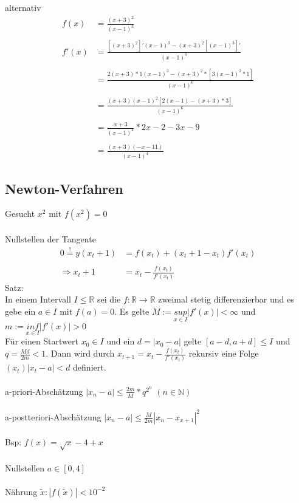 \documentclass{article}
\begin{document}

alternativ
\begin{align*}
f(x) &= \frac {(x+3)^2}{(x-1)^3}\\\\
f'(x) &= \frac{[(x+3)^2]'(x-1)^3-(x+3)^2[(x-1)^3]'}{(x-1)^6}\\\\
&= \frac{2(x+3)*1(x-1)^3 - (x+3)^2 *[3(x-1)^2 *1]}{(x-1)^6}\\\\
&= \frac{(x+3)(x-1)^2[2(x-1)-(x+3)*3]}{(x-1)^6}\\\\
&= \frac{x+3}{(x-1)^4} * 2x-2-3x-9\\\\
&= \frac{(x+3)(-x-11)}{(x-1)^4}
\end{align*}

\subsection{Newton-Verfahren}

Gesucht \(x^2\) mit \(f(x^2)=0\)\\\\
Nullstellen der Tangente
\begin{align*}
0\overset{!}{=}y(x_t+1) &= f(x_t)+(x_t+1-x_t)f'(x_t)\\\\
\Longrightarrow x_t+1 &= x_t - \frac{f(x_t)}{f'(x_t)}
\end{align*}
Satz:\\
In einem Intervall \(I \le \mathbb{R}\) sei die \(f:\mathbb{R} \rightarrow \mathbb{R}\) zweimal stetig differenzierbar und es gebe ein \(a \in I\) mit \(f(a)=0\). Es gelte \(M := \underset{x \in I}{sup} |f'(x)| < \infty\) und \(m := \underset{x \in I}{inf} |f'(x)| > 0\)\\
Für einen Startwert \(x_0 \in I\) und ein \(d = |x_0 -a|\) gelte \([a-d,a+d] \leq I\) und \(q = \frac{Md}{2m} < 1\). Dann wird durch \(x_{t+1} = x_t - \frac{f(x_t)}{f'(x_t)}\) rekursiv eine Folge \((x_t) |x_t -a|<d\) definiert.\\\\
a-priori-Abschätzung \(|x_n -a| \leq \frac{2m}{M} * q^{2^n}\)  \((n \in \mathbb{N})\)\\\\
a-postteriori-Abschätzung \(|x_n -a| \leq \frac{M}{2m}|x_n - x_{x+1}|^2\)\\\\
Bsp: \(f(x) = \sqrt{x}-4+x\)\\\\
Nullstellen \(a \in [0,4]\)\\\\
Nährung \(\widetilde{x} : |f(\widetilde{x})| < 10^{-2}\)

\end{document}
